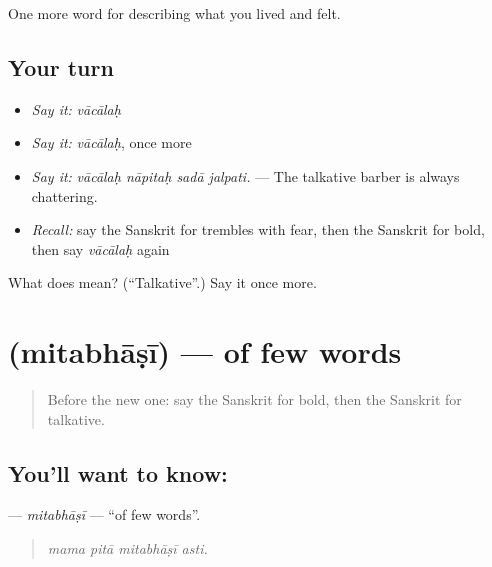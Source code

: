\begin{grammarlens}[title={What you've built}]
One more word for describing what you lived and felt.
\end{grammarlens}

\subsection*{Your turn}
\begin{itemize}
\raggedright
  \item \emph{Say it:} \emph{vācālaḥ}
  \item \emph{Say it:} \emph{vācālaḥ}, once more
  \item \emph{Say it:} \emph{vācālaḥ nāpitaḥ sadā jalpati.} — The talkative barber is always chattering.
  \item \emph{Recall:} say the Sanskrit for trembles with fear, then the Sanskrit for bold, then say \emph{vācālaḥ} again
\end{itemize}

\begin{tcolorbox}[breakable,colback=teal!4,colframe=teal!35!black,title={Before you move on}]
What does  mean? (\textquotedblleft{}Talkative\textquotedblright{}.) Say it once more.
\end{tcolorbox}
\section[\texorpdfstring{\sk{मितभाषी} (mitabhāṣī)}{मितभाषी (mitabhāṣī)}]{ (mitabhāṣī) — of few words}

\label{lesson:SA-C464-mitabhasi}



\begin{quote}
Before the new one: say the Sanskrit for bold, then the Sanskrit for talkative.
\end{quote}

\subsection*{You'll want to know: }
\textbf{} — \emph{mitabhāṣī} — \textquotedblleft{}of few words\textquotedblright{}.

\begin{quote}
   
\end{quote}

\begin{quote}
\emph{mama pitā mitabhāṣī asti.}
\end{quote}

